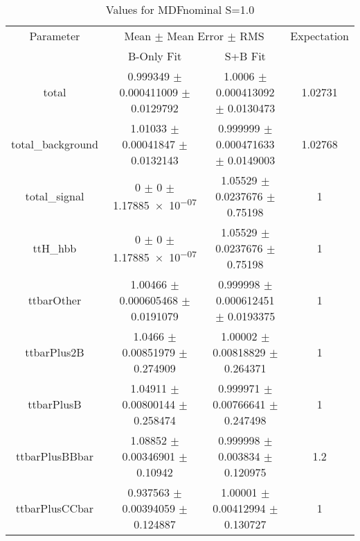 \begin{table}
\centering
\caption{Values for MDFnominal S=1.0}
\begin{tabular}{cccc}
\toprule
Parameter & \multicolumn{2}{c}{Mean $\pm$ Mean Error $\pm$ RMS} & Expectation\\
 & B-Only Fit & S+B Fit & \\
\midrule
total & \num{0.999349} $\pm$ \num{0.000411009} $\pm$ \num{0.0129792} & \num{1.0006} $\pm$ \num{0.000413092} $\pm$ \num{0.0130473} & \num{1.02731}\\
total\_background & \num{1.01033} $\pm$ \num{0.00041847} $\pm$ \num{0.0132143} & \num{0.999999} $\pm$ \num{0.000471633} $\pm$ \num{0.0149003} & \num{1.02768}\\
total\_signal & \num{0} $\pm$ \num{0} $\pm$ \num{1.17885e-07} & \num{1.05529} $\pm$ \num{0.0237676} $\pm$ \num{0.75198} & \num{1}\\
ttH\_hbb & \num{0} $\pm$ \num{0} $\pm$ \num{1.17885e-07} & \num{1.05529} $\pm$ \num{0.0237676} $\pm$ \num{0.75198} & \num{1}\\
ttbarOther & \num{1.00466} $\pm$ \num{0.000605468} $\pm$ \num{0.0191079} & \num{0.999998} $\pm$ \num{0.000612451} $\pm$ \num{0.0193375} & \num{1}\\
ttbarPlus2B & \num{1.0466} $\pm$ \num{0.00851979} $\pm$ \num{0.274909} & \num{1.00002} $\pm$ \num{0.00818829} $\pm$ \num{0.264371} & \num{1}\\
ttbarPlusB & \num{1.04911} $\pm$ \num{0.00800144} $\pm$ \num{0.258474} & \num{0.999971} $\pm$ \num{0.00766641} $\pm$ \num{0.247498} & \num{1}\\
ttbarPlusBBbar & \num{1.08852} $\pm$ \num{0.00346901} $\pm$ \num{0.10942} & \num{0.999998} $\pm$ \num{0.003834} $\pm$ \num{0.120975} & \num{1.2}\\
ttbarPlusCCbar & \num{0.937563} $\pm$ \num{0.00394059} $\pm$ \num{0.124887} & \num{1.00001} $\pm$ \num{0.00412994} $\pm$ \num{0.130727} & \num{1}\\
\bottomrule
\end{tabular}
\end{table}
